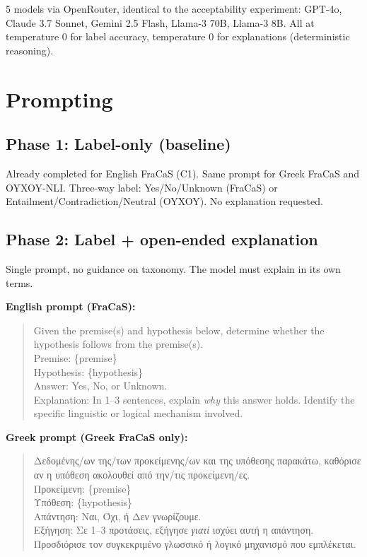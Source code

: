 \documentclass[11pt,a4paper]{article}
\begin{document}
5 models via OpenRouter, identical to the acceptability experiment: GPT-4o, Claude 3.7 Sonnet, Gemini 2.5 Flash, Llama-3 70B, Llama-3 8B. All at temperature 0 for label accuracy, temperature 0 for explanations (deterministic reasoning).

\section{Prompting}

\subsection{Phase 1: Label-only (baseline)}

Already completed for English FraCaS (C1). Same prompt for Greek FraCaS and OYXOY-NLI. Three-way label: Yes/No/Unknown (FraCaS) or Entailment/Contradiction/Neutral (OYXOY). No explanation requested.

\subsection{Phase 2: Label + open-ended explanation}

Single prompt, no guidance on taxonomy. The model must explain in its own terms.

\medskip
\textbf{English prompt (FraCaS):}

\begin{quote}\small\ttfamily
Given the premise(s) and hypothesis below, determine whether the hypothesis follows from the premise(s).\\[2pt]
Premise: \{premise\}\\
Hypothesis: \{hypothesis\}\\[2pt]
Answer: Yes, No, or Unknown.\\
Explanation: In 1--3 sentences, explain \textit{why} this answer holds. Identify the specific linguistic or logical mechanism involved.
\end{quote}

\textbf{Greek prompt (Greek FraCaS only):}

\begin{quote}\small\ttfamily
Δεδομένης/ων της/των προκείμενης/ων και της υπόθεσης παρακάτω, καθόρισε αν η υπόθεση ακολουθεί από την/τις προκείμενη/ες.\\[2pt]
Προκείμενη: \{premise\}\\
Υπόθεση: \{hypothesis\}\\[2pt]
Απάντηση: Ναι, Όχι, ή Δεν γνωρίζουμε.\\
Εξήγηση: Σε 1--3 προτάσεις, εξήγησε \textit{γιατί} ισχύει αυτή η απάντηση. Προσδιόρισε τον συγκεκριμένο γλωσσικό ή λογικό μηχανισμό που εμπλέκεται.
\end{quote}
\end{document}
